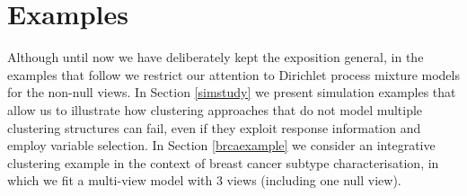 \documentclass[12pt]{article}
\begin{document}
\section{Examples}
Although until now we have deliberately kept the exposition general, in the examples that follow we restrict our attention to Dirichlet process mixture models for the non-null views.  In Section \ref{simstudy} we present simulation examples that allow us to illustrate how clustering approaches that do not model multiple clustering structures can fail, even if they exploit response information and employ variable selection.  In Section \ref{brcaexample} we consider an integrative clustering example in the context of breast cancer subtype characterisation, in which we fit a multi-view model with 3 views (including one null view).  %
\end{document}
